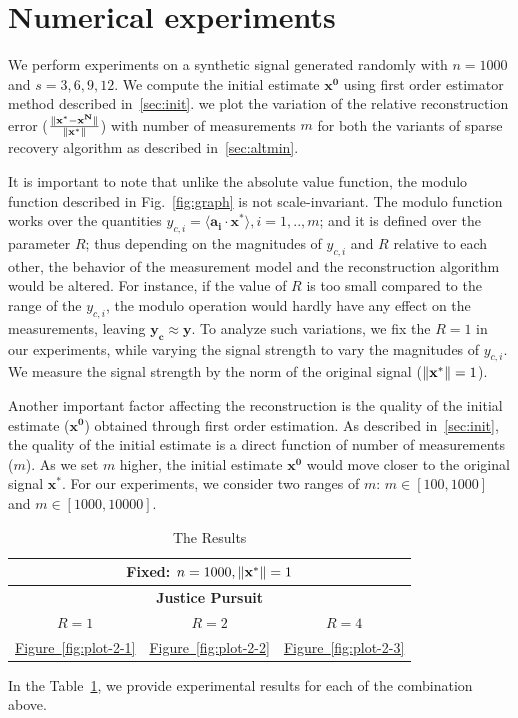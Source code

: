 \section{Numerical experiments}
\label{sec:exp}
We perform experiments on a synthetic signal generated randomly with $n=1000$ and $s={3,6,9,12}$. We compute the initial estimate $\mathbf{x^0}$ using first order estimator method described in~\ref{sec:init}. we plot the variation of the relative reconstruction error ($\frac{\|\mathbf{x^*-x^N}\|}{\|\mathbf{x^*}\|}$) with number of measurements $m$ for both the variants of sparse recovery algorithm as described in~\ref{sec:altmin}.

It is important to note that unlike the absolute value function, the modulo function described in Fig.~\ref{fig:graph} is not scale-invariant. The modulo function works over the quantities $y_{c,i}=\langle \mathbf{a_i} \cdot \mathbf{x^*} \rangle, i=1,..,m$; and it is defined over the parameter $R$; thus depending on the magnitudes of $y_{c,i}$ and $R$ relative to each other, the behavior of the measurement model and the reconstruction algorithm would be altered. For instance, if the value of $R$ is too small compared to the range of the $y_{c,i}$, the modulo operation would hardly have any effect on the measurements, leaving $\mathbf{y_c \approx y}$. To analyze such variations, we fix the $R =1$ in our experiments, while varying the signal strength to vary the magnitudes of $y_{c,i}$. We measure the signal strength by the norm of the original signal ($\|\mathbf{{x}^*}\|=1$).

Another important factor affecting the reconstruction is the quality of the initial estimate ($\mathbf{{x}^0}$) obtained through first order estimation. As described in~\ref{sec:init}, the quality of the initial estimate is a direct function of number of measurements ($m$). As we set $m$ higher, the initial estimate $\mathbf{{x}^0}$ would move closer to the original signal $\mathbf{{x}^*}$. For our experiments, we consider two ranges of $m$: $m \in [100,1000]$ and $m \in [1000,10000]$.


\begin{center}
	\begin{table}[h]
		\centering
		\begin{tabular}{ccc}\toprule
			\multicolumn{3}{c}{\small{\textbf{Fixed:} $n=1000,\|\mathbf{{x}^*}\|=1$}} \\ \midrule
			\multicolumn{3}{c}{\textbf{Justice Pursuit}}
			\\\cmidrule(r){1-3}%
			\small{$R =1$}&\small{$R=2$}&\small{$R=4$} \\\midrule
			\hyperref[fig:plot-2-1]{Figure~\ref{fig:plot-2-1}} & \hyperref[fig:plot-2-2]{Figure~\ref{fig:plot-2-2}}
			& \hyperref[fig:plot-2-3]{Figure~\ref{fig:plot-2-3}} \\
			\bottomrule
		\end{tabular}
		\caption{The Results}\label{Tab3}
	\end{table} 	
\end{center}
In the Table~\ref{Tab3}, we provide experimental results for each of the combination above.

